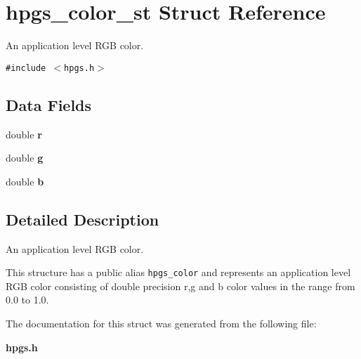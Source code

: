 \section{hpgs\_\-color\_\-st Struct Reference}
\label{structhpgs__color__st}
An application level RGB color.  


{\tt \#include $<$hpgs.h$>$}

\subsection*{Data Fields}
\begin{CompactItemize}
\item 
double \textbf{r}\label{structhpgs__color__st_6764850c4a93fbd3feab36f958c5734a}

\item 
double \textbf{g}\label{structhpgs__color__st_df3a418d27cf41ebe5257e6409b1c7f1}

\item 
double \textbf{b}\label{structhpgs__color__st_3f76215cdf0bc92475c69d4a2449be58}

\end{CompactItemize}


\subsection{Detailed Description}
An application level RGB color. 

This structure has a public alias {\tt hpgs\_\-color} and represents an application level RGB color consisting of double precision r,g and b color values in the range from 0.0 to 1.0. 

The documentation for this struct was generated from the following file:\begin{CompactItemize}
\item 
{\bf hpgs.h}\end{CompactItemize}
